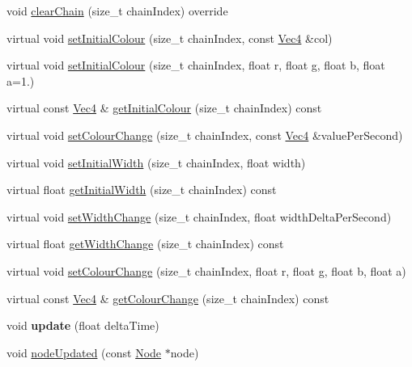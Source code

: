 \begin{DoxyCompactItemize}
void \hyperlink{classPURibbonTrail_adb54132f235ef4e7378059f72c76afd2}{clear\+Chain} (size\+\_\+t chain\+Index) override
\item 
virtual void \hyperlink{classPURibbonTrail_a5a84fe723e163b729896fb5f307fe04b}{set\+Initial\+Colour} (size\+\_\+t chain\+Index, const \hyperlink{classVec4}{Vec4} \&col)
\item 
virtual void \hyperlink{classPURibbonTrail_a358e7014b6eb2d7a3a3cbfaf28455e4f}{set\+Initial\+Colour} (size\+\_\+t chain\+Index, float r, float g, float b, float a=1.)
\item 
virtual const \hyperlink{classVec4}{Vec4} \& \hyperlink{classPURibbonTrail_ae68d1591603536035c6c31736c298356}{get\+Initial\+Colour} (size\+\_\+t chain\+Index) const
\item 
virtual void \hyperlink{classPURibbonTrail_a110171311c7a9bd54e247133943fd4c7}{set\+Colour\+Change} (size\+\_\+t chain\+Index, const \hyperlink{classVec4}{Vec4} \&value\+Per\+Second)
\item 
virtual void \hyperlink{classPURibbonTrail_a15332ae9a9cd320b5dfa5537777ce77b}{set\+Initial\+Width} (size\+\_\+t chain\+Index, float width)
\item 
virtual float \hyperlink{classPURibbonTrail_aef05b972efc8314ac9474f947b4c2295}{get\+Initial\+Width} (size\+\_\+t chain\+Index) const
\item 
virtual void \hyperlink{classPURibbonTrail_a744d20056345182e98e7e8a54657fd0b}{set\+Width\+Change} (size\+\_\+t chain\+Index, float width\+Delta\+Per\+Second)
\item 
virtual float \hyperlink{classPURibbonTrail_a4a8d19d06f53121cc8c6332a5c7106ef}{get\+Width\+Change} (size\+\_\+t chain\+Index) const
\item 
virtual void \hyperlink{classPURibbonTrail_a7e97efa8ae300499c7de548705cd0873}{set\+Colour\+Change} (size\+\_\+t chain\+Index, float r, float g, float b, float a)
\item 
virtual const \hyperlink{classVec4}{Vec4} \& \hyperlink{classPURibbonTrail_acb288780202f2382d949f80be32b02ab}{get\+Colour\+Change} (size\+\_\+t chain\+Index) const
\item 
\mbox{\label{classPURibbonTrail_a67e9519e2613d8aaf1b4dd92f26f49be}} 
void {\bfseries update} (float delta\+Time)
\item 
void \hyperlink{classPURibbonTrail_a67db1906af616c173f790428bd98f318}{node\+Updated} (const \hyperlink{classNode}{Node} $\ast$node)
\item 

\end{DoxyCompactItemize}
